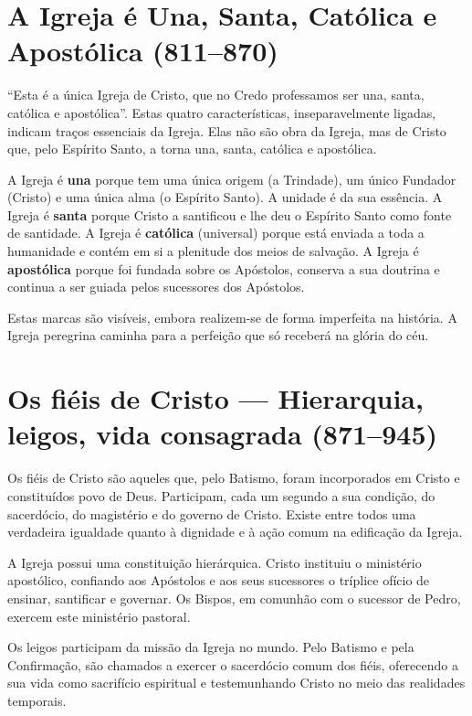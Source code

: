 \section{A Igreja é Una, Santa, Católica e Apostólica (811--870)}

``Esta é a única Igreja de Cristo, que no Credo professamos ser una, santa, católica e apostólica''. Estas quatro características, inseparavelmente ligadas, indicam traços essenciais da Igreja. Elas não são obra da Igreja, mas de Cristo que, pelo Espírito Santo, a torna una, santa, católica e apostólica.

A Igreja é \textbf{una} porque tem uma única origem (a Trindade), um único Fundador (Cristo) e uma única alma (o Espírito Santo). A unidade é da sua essência. A Igreja é \textbf{santa} porque Cristo a santificou e lhe deu o Espírito Santo como fonte de santidade. A Igreja é \textbf{católica} (universal) porque está enviada a toda a humanidade e contém em si a plenitude dos meios de salvação. A Igreja é \textbf{apostólica} porque foi fundada sobre os Apóstolos, conserva a sua doutrina e continua a ser guiada pelos sucessores dos Apóstolos.

Estas marcas são visíveis, embora realizem-se de forma imperfeita na história. A Igreja peregrina caminha para a perfeição que só receberá na glória do céu.

\section{Os fiéis de Cristo --- Hierarquia, leigos, vida consagrada (871--945)}

Os fiéis de Cristo são aqueles que, pelo Batismo, foram incorporados em Cristo e constituídos povo de Deus. Participam, cada um segundo a sua condição, do sacerdócio, do magistério e do governo de Cristo. Existe entre todos uma verdadeira igualdade quanto à dignidade e à ação comum na edificação da Igreja.

A Igreja possui uma constituição hierárquica. Cristo instituiu o ministério apostólico, confiando aos Apóstolos e aos seus sucessores o tríplice ofício de ensinar, santificar e governar. Os Bispos, em comunhão com o sucessor de Pedro, exercem este ministério pastoral.

Os leigos participam da missão da Igreja no mundo. Pelo Batismo e pela Confirmação, são chamados a exercer o sacerdócio comum dos fiéis, oferecendo a sua vida como sacrifício espiritual e testemunhando Cristo no meio das realidades temporais.

